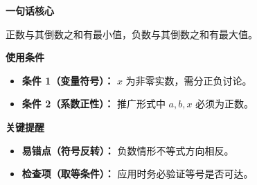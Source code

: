 \begin{summarybox}
\textbf{\textcolor{CSummary}{一句话核心}}

正数与其倒数之和有最小值，负数与其倒数之和有最大值。

\medskip
\textbf{\textcolor{CSummary}{使用条件}}
\begin{itemize}[leftmargin=*, itemsep=0.5em, topsep=0.4em]
    \item \textbf{条件 1（变量符号）：} $x$ 为非零实数，需分正负讨论。
    \item \textbf{条件 2（系数正性）：} 推广形式中 $a, b, x$ 必须为正数。
\end{itemize}

\medskip
\textbf{\textcolor{CSummary}{关键提醒}}
\begin{itemize}[leftmargin=*, itemsep=0.5em, topsep=0.4em]
    \item \textbf{易错点（符号反转）：} 负数情形不等式方向相反。
    \item \textbf{检查项（取等条件）：} 应用时务必验证等号是否可达。
\end{itemize}
\end{summarybox}
